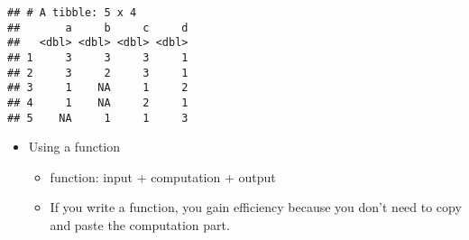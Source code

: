 \documentclass[
]{book}
\newenvironment{Shaded}{\begin{snugshade}}{\end{snugshade}}
\newcommand{\CommentTok}[1]{\textcolor[rgb]{0.56,0.35,0.01}{\textit{#1}}}
\newcommand{\DecValTok}[1]{\textcolor[rgb]{0.00,0.00,0.81}{#1}}
\newcommand{\NormalTok}[1]{#1}
\newcommand{\OperatorTok}[1]{\textcolor[rgb]{0.81,0.36,0.00}{\textbf{#1}}}
\newcommand{\OtherTok}[1]{\textcolor[rgb]{0.56,0.35,0.01}{#1}}
\newcommand{\StringTok}[1]{\textcolor[rgb]{0.31,0.60,0.02}{#1}}
\providecommand{\tightlist}{%
  \setlength{\itemsep}{0pt}\setlength{\parskip}{0pt}}
\begin{document}
\begin{Shaded}
\end{Shaded}

\begin{verbatim}
## # A tibble: 5 x 4
##       a     b     c     d
##   <dbl> <dbl> <dbl> <dbl>
## 1     3     3     3     1
## 2     3     2     3     1
## 3     1    NA     1     2
## 4     1    NA     2     1
## 5    NA     1     1     3
\end{verbatim}

\begin{itemize}
\tightlist
\item
  Using a function

  \begin{itemize}
  \tightlist
  \item
    function: input + computation + output
  \item
    If you write a function, you gain efficiency because you don't need to copy and paste the computation part.
  \end{itemize}
\end{itemize}
\end{document}
